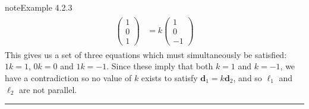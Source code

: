 \documentclass[letterpaper,10pt,english]{jupyterBook}
\begin{document}
\begin{sphinxadmonition}{note}{Example 4.2.3}
\begin{equation*}
\begin{split} \begin{align*}
    \begin{pmatrix} 1 \\ 0 \\ 1 \end{pmatrix} &= k
    \begin{pmatrix} 1 \\ 0 \\ -1 \end{pmatrix}
\end{align*} \end{split}
\end{equation*}
\sphinxAtStartPar
This gives us a set of three equations which must simultaneously be satisfied: \(1k =1\), \(0k=0\) and \(1k = -1\). Since these imply that both \(k=1\) and \(k=-1\), we have a contradiction \sphinxhyphen{} so no value of \(k\) exists to satisfy \(\mathbf{d}_1 = k\mathbf{d}_2\), and so \(\ell_1\) and \(\ell_2\) are not parallel.
\end{sphinxadmonition}


\bigskip\hrule\bigskip


\ignorespaces 
\end{document}
